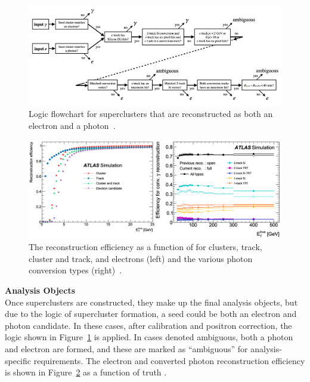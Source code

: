 \begin{figure}[!htb]
    \centering
    \includegraphics[width=1\textwidth]{chapters/chapter3_eventreco/images/egamma-amb.png}

    \caption[Logic flowchart for superclusters that are reconstructed as both an electron and a photon]{Logic flowchart for superclusters that are reconstructed as both an electron and a photon~\cite{photon-electron-perf}.}
    \label{fig:ambiguity-logic}
\end{figure}


\begin{figure}[!htb]
    \centering
    \includegraphics[width=1\textwidth]{chapters/chapter3_eventreco/images/combined-efficiency.png}

    \caption[The reconstruction efficiency as a function of \et for electrons and converted photons]{The reconstruction efficiency as a function of \et for clusters, track, cluster and track, and electrons (left) and the various photon conversion types (right)~\cite{photon-electron-perf}.}
    \label{fig:reco-eff}
\end{figure}

\noindent\textbf{Analysis Objects}\\ 
\indent Once superclusters are constructed, they make up the final analysis objects, but due to the logic of supercluster formation, a seed could be both an electron and photon candidate. In these cases, after calibration and positron correction, the logic shown in Figure~\ref{fig:ambiguity-logic} is applied. In cases denoted ambiguous, both a photon and electron are formed, and these are marked as ``ambiguous'' for analysis-specific requirements. The electron and converted photon reconstruction efficiency is shown in Figure~\ref{fig:reco-eff} as a function of truth \et.

